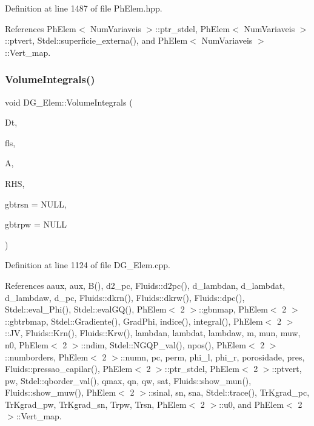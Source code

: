 Definition at line 1487 of file Ph\+Elem.\+hpp.



References Ph\+Elem$<$ Num\+Variaveis $>$\+::ptr\+\_\+stdel, Ph\+Elem$<$ Num\+Variaveis $>$\+::ptvert, Stdel\+::superficie\+\_\+externa(), and Ph\+Elem$<$ Num\+Variaveis $>$\+::\+Vert\+\_\+map.

\mbox{\label{classDG__Elem_a166b7ad0ea852f703f65661c14b5c713}} 
\subsubsection{\texorpdfstring{Volume\+Integrals()}{VolumeIntegrals()}}
{\footnotesize\ttfamily void D\+G\+\_\+\+Elem\+::\+Volume\+Integrals (\begin{DoxyParamCaption}\item[{const double}]{Dt,  }\item[{\hyperlink{classFluids}{Fluids}}]{fls,  }\item[{Teuchos\+::\+R\+CP$<$ Epetra\+\_\+\+F\+E\+Crs\+Matrix $>$}]{A,  }\item[{Teuchos\+::\+R\+CP$<$ Epetra\+\_\+\+F\+E\+Vector $>$}]{R\+HS,  }\item[{double $\ast$}]{gbtrsn = {\ttfamily NULL},  }\item[{double $\ast$}]{gbtrpw = {\ttfamily NULL} }\end{DoxyParamCaption})}



Definition at line 1124 of file D\+G\+\_\+\+Elem.\+cpp.



References aaux, aux, B(), d2\+\_\+pc, Fluids\+::d2pc(), d\+\_\+lambdan, d\+\_\+lambdat, d\+\_\+lambdaw, d\+\_\+pc, Fluids\+::dkrn(), Fluids\+::dkrw(), Fluids\+::dpc(), Stdel\+::eval\+\_\+\+Phi(), Stdel\+::eval\+G\+Q(), Ph\+Elem$<$ 2 $>$\+::gbnmap, Ph\+Elem$<$ 2 $>$\+::gbtrbmap, Stdel\+::\+Gradiente(), Grad\+Phi, indice(), integral(), Ph\+Elem$<$ 2 $>$\+::\+JV, Fluids\+::\+Krn(), Fluids\+::\+Krw(), lambdan, lambdat, lambdaw, m, mun, muw, n0, Ph\+Elem$<$ 2 $>$\+::ndim, Stdel\+::\+N\+G\+Q\+P\+\_\+val(), npos(), Ph\+Elem$<$ 2 $>$\+::numborders, Ph\+Elem$<$ 2 $>$\+::numn, pc, perm, phi\+\_\+l, phi\+\_\+r, porosidade, pres, Fluids\+::pressao\+\_\+capilar(), Ph\+Elem$<$ 2 $>$\+::ptr\+\_\+stdel, Ph\+Elem$<$ 2 $>$\+::ptvert, pw, Stdel\+::qborder\+\_\+val(), qmax, qn, qw, sat, Fluids\+::show\+\_\+mun(), Fluids\+::show\+\_\+muw(), Ph\+Elem$<$ 2 $>$\+::sinal, sn, sna, Stdel\+::trace(), Tr\+Kgrad\+\_\+pc, Tr\+Kgrad\+\_\+pw, Tr\+Kgrad\+\_\+sn, Trpw, Trsn, Ph\+Elem$<$ 2 $>$\+::u0, and Ph\+Elem$<$ 2 $>$\+::\+Vert\+\_\+map.



